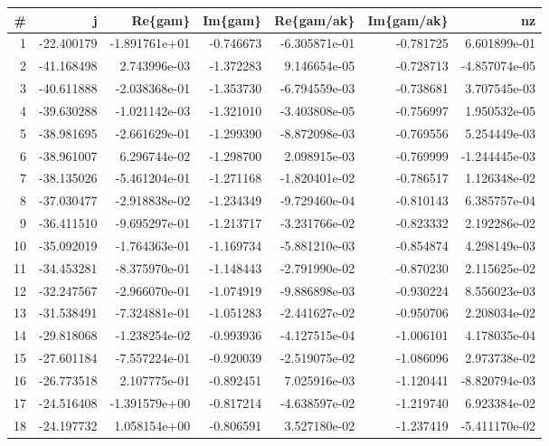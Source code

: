 \begin{tabular}{rrrrrrr}
\toprule
 \# &          j &       Re\{gam\} &   Im\{gam\} &    Re\{gam/ak\} &  Im\{gam/ak\} &            nz \\
\midrule
 1 & -22.400179 & -1.891761e+01 & -0.746673 & -6.305871e-01 &   -0.781725 &  6.601899e-01 \\
 2 & -41.168498 &  2.743996e-03 & -1.372283 &  9.146654e-05 &   -0.728713 & -4.857074e-05 \\
 3 & -40.611888 & -2.038368e-01 & -1.353730 & -6.794559e-03 &   -0.738681 &  3.707545e-03 \\
 4 & -39.630288 & -1.021142e-03 & -1.321010 & -3.403808e-05 &   -0.756997 &  1.950532e-05 \\
 5 & -38.981695 & -2.661629e-01 & -1.299390 & -8.872098e-03 &   -0.769556 &  5.254449e-03 \\
 6 & -38.961007 &  6.296744e-02 & -1.298700 &  2.098915e-03 &   -0.769999 & -1.244445e-03 \\
 7 & -38.135026 & -5.461204e-01 & -1.271168 & -1.820401e-02 &   -0.786517 &  1.126348e-02 \\
 8 & -37.030477 & -2.918838e-02 & -1.234349 & -9.729460e-04 &   -0.810143 &  6.385757e-04 \\
 9 & -36.411510 & -9.695297e-01 & -1.213717 & -3.231766e-02 &   -0.823332 &  2.192286e-02 \\
10 & -35.092019 & -1.764363e-01 & -1.169734 & -5.881210e-03 &   -0.854874 &  4.298149e-03 \\
11 & -34.453281 & -8.375970e-01 & -1.148443 & -2.791990e-02 &   -0.870230 &  2.115625e-02 \\
12 & -32.247567 & -2.966070e-01 & -1.074919 & -9.886898e-03 &   -0.930224 &  8.556023e-03 \\
13 & -31.538491 & -7.324881e-01 & -1.051283 & -2.441627e-02 &   -0.950706 &  2.208034e-02 \\
14 & -29.818068 & -1.238254e-02 & -0.993936 & -4.127515e-04 &   -1.006101 &  4.178035e-04 \\
15 & -27.601184 & -7.557224e-01 & -0.920039 & -2.519075e-02 &   -1.086096 &  2.973738e-02 \\
16 & -26.773518 &  2.107775e-01 & -0.892451 &  7.025916e-03 &   -1.120441 & -8.820794e-03 \\
17 & -24.516408 & -1.391579e+00 & -0.817214 & -4.638597e-02 &   -1.219740 &  6.923384e-02 \\
18 & -24.197732 &  1.058154e+00 & -0.806591 &  3.527180e-02 &   -1.237419 & -5.411170e-02 \\

\end{tabular}
